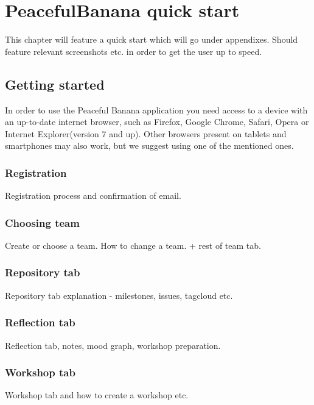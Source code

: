 \chapter*{PeacefulBanana quick start}
This chapter will feature a quick start which will go under appendixes. 
Should feature relevant screenshots etc. in order to get the user up to speed. 


\section*{Getting started}
In order to use the Peaceful Banana application you need access to a device with an up-to-date internet browser, such as Firefox, Google Chrome, Safari, Opera or Internet Explorer(version 7 and up). Other browsers present on tablets and smartphones may also work, but we suggest using one of the mentioned ones. 

\subsection*{Registration}
Registration process and confirmation of email. 
\subsection*{Choosing team}
Create or choose a team. How to change a team. + rest of team tab. 
\subsection*{Repository tab}
Repository tab explanation - milestones, issues, tagcloud etc.
\subsection*{Reflection tab}
Reflection tab, notes, mood graph, workshop preparation.
\subsection*{Workshop tab}
Workshop tab and how to create a workshop etc. 
